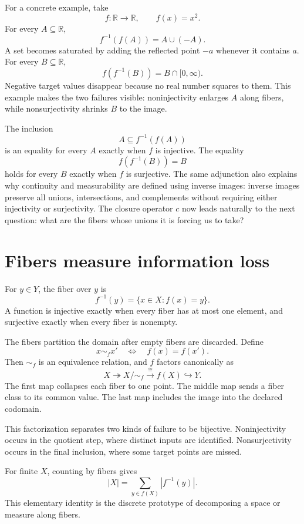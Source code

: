 For a concrete example, take
\[
  f:\mathbb R\to\mathbb R,
  \qquad
  f(x)=x^2.
\]
For every \(A\subseteq\mathbb R\),
\[
  f^{-1}(f(A))=A\cup(-A).
\]
A set becomes saturated by adding the reflected point \(-a\) whenever it contains \(a\).  For every \(B\subseteq\mathbb R\),
\[
  f(f^{-1}(B))=B\cap[0,\infty).
\]
Negative target values disappear because no real number squares to them.  This example makes the two failures visible: noninjectivity enlarges \(A\) along fibers, while nonsurjectivity shrinks \(B\) to the image.

The inclusion
\[
  A\subseteq f^{-1}(f(A))
\]
is an equality for every \(A\) exactly when \(f\) is injective.  The equality
\[
  f(f^{-1}(B))=B
\]
holds for every \(B\) exactly when \(f\) is surjective.  The same adjunction also explains why continuity and measurability are defined using inverse images: inverse images preserve all unions, intersections, and complements without requiring either injectivity or surjectivity.  The closure operator \(c\) now leads naturally to the next question: what are the fibers whose unions it is forcing us to take?

\section{Fibers measure information loss}

For \(y\in Y\), the fiber over \(y\) is
\[
  f^{-1}(y)=\{x\in X:f(x)=y\}.
\]
A function is injective exactly when every fiber has at most one element, and surjective exactly when every fiber is nonempty.

The fibers partition the domain after empty fibers are discarded.  Define
\[
  x\sim_f x'
  \quad\Longleftrightarrow\quad
  f(x)=f(x').
\]
Then \(\sim_f\) is an equivalence relation, and \(f\) factors canonically as
\[
  X
  \twoheadrightarrow
  X/{\sim_f}
  \xrightarrow{\cong}
  f(X)
  \hookrightarrow
  Y.
\]
The first map collapses each fiber to one point.  The middle map sends a fiber class to its common value.  The last map includes the image into the declared codomain.

This factorization separates two kinds of failure to be bijective.  Noninjectivity occurs in the quotient step, where distinct inputs are identified.  Nonsurjectivity occurs in the final inclusion, where some target points are missed.

For finite \(X\), counting by fibers gives
\[
  |X|=\sum_{y\in f(X)}|f^{-1}(y)|.
\]
This elementary identity is the discrete prototype of decomposing a space or measure along fibers.

